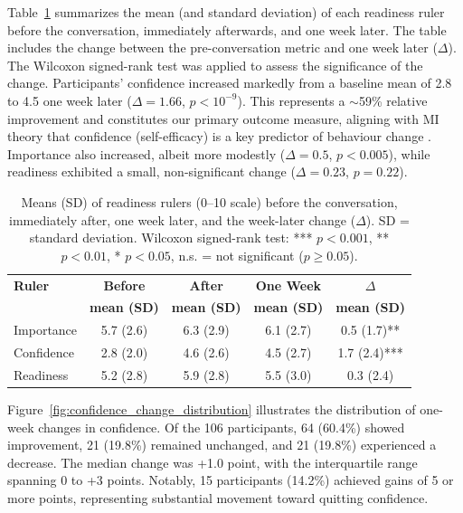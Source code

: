 Table~\ref{table:mibot_ruler_summary} summarizes the mean (and standard deviation) of each readiness ruler before the conversation, immediately afterwards, and one week later.   The table includes the change between the pre-conversation metric and one week later ($\Delta$). The Wilcoxon signed-rank test was applied to assess the significance of the change. Participants' confidence increased markedly from a baseline mean of 2.8 to 4.5 one week later ($\Delta=1.66$, $p<10^{-9}$). This represents a $\sim$59\% relative improvement and constitutes our primary outcome measure, aligning with MI theory that confidence (self-efficacy) is a key predictor of behaviour change \citep{Gwaltney2009-wj,Abar2013}. Importance also increased, albeit more modestly ($\Delta=0.5$, $p<0.005$), while readiness exhibited a small, non-significant change ($\Delta=0.23$, $p=0.22$).

\begin{table}[ht!]
  \centering
  \small
  \setlength{\tabcolsep}{4pt}
  \renewcommand{\arraystretch}{1.1}
  \begin{tabular}{@{}lcccc@{}}
    \toprule
    \textbf{Ruler} & \textbf{Before} & \textbf{After} & \textbf{One Week} & \textbf{$\Delta$} \\
    & \textbf{mean (SD)} & \textbf{mean (SD)} & \textbf{mean (SD)} & \textbf{mean (SD)} \\
    \midrule
    Importance & 5.7 (2.6) & 6.3 (2.9) & 6.1 (2.7) & 0.5 (1.7)** \\
    Confidence & 2.8 (2.0) & 4.6 (2.6) & 4.5 (2.7) & 1.7 (2.4)*** \\
    Readiness  & 5.2 (2.8) & 5.9 (2.8) & 5.5 (3.0) & 0.3 (2.4) \\
    \bottomrule
  \end{tabular}
  \caption{Means (SD) of readiness rulers (0--10 scale) before the conversation, immediately after, one week later, and the week-later change ($\Delta$). SD = standard deviation. Wilcoxon signed-rank test: *** $p < 0.001$, ** $p < 0.01$, * $p < 0.05$, n.s. = not significant ($p \geq 0.05$).}
  \label{table:mibot_ruler_summary}
\end{table}

Figure~\ref{fig:confidence_change_distribution} illustrates the distribution of one-week changes in confidence. Of the 106 participants, 64 (60.4\%) showed improvement, 21 (19.8\%) remained unchanged, and 21 (19.8\%) experienced a decrease. The median change was +1.0 point, with the interquartile range spanning 0 to +3 points. Notably, 15 participants (14.2\%) achieved gains of 5 or more points, representing substantial movement toward quitting confidence.


